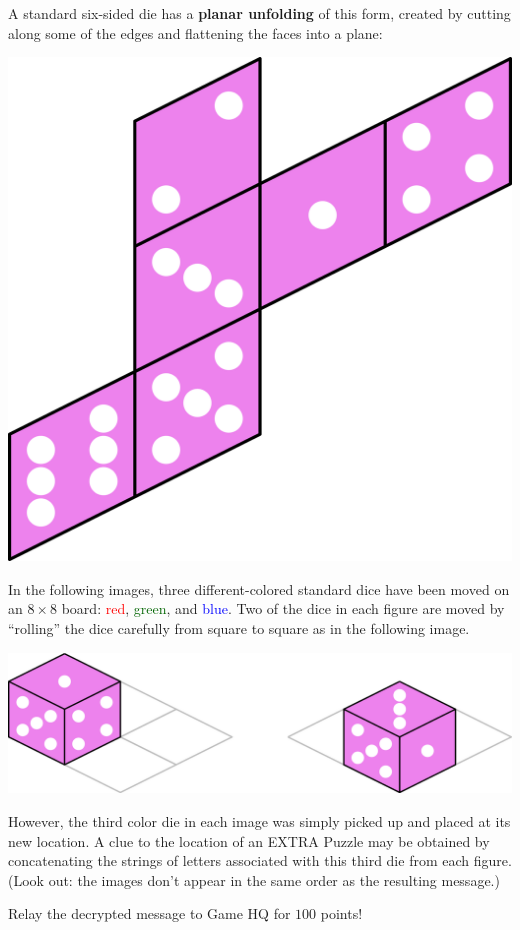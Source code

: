 


A standard six-sided die has a \textbf{planar unfolding} of this form,
  created by cutting along some of the edges and flattening the faces into
  a plane:

  \vfill

\begin{center}
 \includegraphics[width=0.3\linewidth]{diceExample.png}
\end{center}

  \vfill

  In the following images, three different-colored standard dice have been
  moved on an $8\times 8$ board:
    \textcolor{red}{red},
    \textcolor{darkGreen}{green}, and
    \textcolor{blue}{blue}.
  Two of the dice in each figure are moved by ``rolling'' the dice carefully
  from square to square as in the following image.

  \vfill

\begin{center}
  \includegraphics[width=0.5\linewidth]{diceLegal.png}
\end{center}

  \vfill

  However, the third color die in each image was simply picked up
  and placed at its new location. A clue to the location of an
  EXTRA Puzzle may
  be obtained by concatenating the strings of letters associated with this
  third die from each figure. (Look out: the images don't appear in the
  same order as the resulting message.)

  Relay the decrypted message to Game HQ for \(100\) points!

  \vfill

